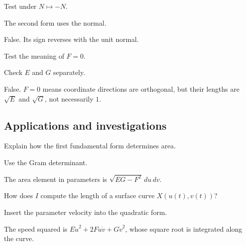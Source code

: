 \begin{exercise}\label{exr:vii15-ped-11}
Test under \(N\mapsto-N\).
\end{exercise}
\begin{hint}
The second form uses the normal.
\end{hint}
\begin{solution}
False.  Its sign reverses with the unit normal.
\end{solution}

\begin{exercise}[\(F=0\) means unit coordinates]\label{exr:vii15-ped-12}
Test the meaning of \(F=0\).
\end{exercise}
\begin{hint}
Check \(E\) and \(G\) separately.
\end{hint}
\begin{solution}
False.  \(F=0\) means coordinate directions are orthogonal, but their lengths are \(\sqrt E\) and \(\sqrt G\), not necessarily \(1\).
\end{solution}

\subsection*{Applications and investigations}

\begin{exercise}\label{exr:vii15-ped-13}
Explain how the first fundamental form determines area.
\end{exercise}
\begin{hint}
Use the Gram determinant.
\end{hint}
\begin{solution}
The area element in parameters is \(\sqrt{EG-F^2}\,du\,dv\).
\end{solution}

\begin{exercise}\label{exr:vii15-ped-14}
How does \(I\) compute the length of a surface curve \(X(u(t),v(t))\)?
\end{exercise}
\begin{hint}
Insert the parameter velocity into the quadratic form.
\end{hint}
\begin{solution}
The speed squared is \(E\dot u^2+2F\dot u\dot v+G\dot v^2\), whose square root is integrated along the curve.
\end{solution}

